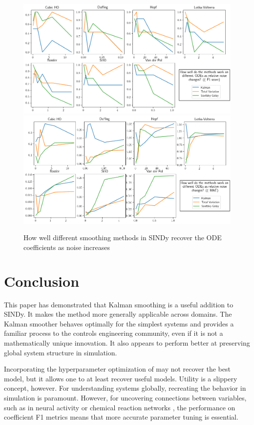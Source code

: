 \documentclass{article}
\begin{document}
\begin{figure}
    \label{fig:noise}
    \includegraphics[width=\textwidth]{images/summary_f1_noise.png}
    \includegraphics[width=\textwidth]{images/summary_mae_noise.png}
    \caption{How well different smoothing methods in SINDy recover the ODE coefficients as noise increases}
\end{figure}

\section{Conclusion}
This paper has demonstrated that Kalman smoothing is a useful addition to SINDy.  It makes the method more generally applicable across domains. The Kalman smoother behaves optimally for the simplest systems and provides a familiar process to the controls engineering community, even if it is not a mathematically unique innovation.  It also appears to perform better at preserving global system structure in simulation.

Incorporating the hyperparameter optimization of \cite{Barratt2020} may not recover the best model, but it allows one to at least recover useful models.  Utility is a slippery concept, however.  For understanding systems globally, recreating the behavior in simulation is paramount.  However, for uncovering connections between variables, such as in neural activity or chemical reaction networks \cite{Hoffmann2019}, the performance on coefficient F1 metrics means that more accurate parameter tuning is essential.
\end{document}
